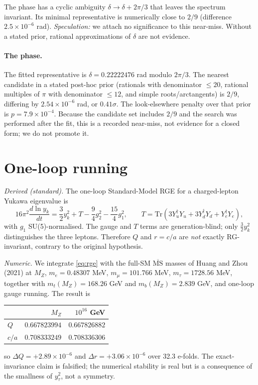 \documentclass[11pt]{article}
\begin{document}
The phase has a cyclic ambiguity $\delta\to\delta+2\pi/3$ that leaves the
spectrum invariant. Its minimal representative is numerically close to $2/9$
(difference $2.5\times10^{-6}$ rad). \emph{Speculation:} we attach no
significance to this near-miss. Without a stated prior, rational
approximations of $\delta$ are not evidence.

\paragraph{The phase.} The fitted representative is
$\delta=0.22222476$ rad modulo $2\pi/3$. The nearest candidate in a stated
post-hoc prior (rationals with denominator $\le20$, rational multiples of
$\pi$ with denominator $\le12$, and simple roots/arctangents) is $2/9$,
differing by $2.54\times10^{-6}$ rad, or $0.41\sigma$. The look-elsewhere
penalty over that prior is $p=7.9\times10^{-4}$. Because the candidate set
includes $2/9$ and the search was performed after the fit, this is a recorded
near-miss, not evidence for a closed form; we do not promote it.

\section{One-loop running}
\label{sec:rg}

\emph{Derived (standard).} The one-loop Standard-Model RGE for a charged-lepton
Yukawa eigenvalue is
\begin{equation}
16\pi^2\frac{d\ln y_k}{dt}
=\frac32 y_k^2+T-\frac94 g_2^2-\frac{15}{4}g_1^2,
\qquad
T=\mathrm{Tr}\!\left(3Y_u^\dagger Y_u+3Y_d^\dagger Y_d+Y_e^\dagger Y_e\right),
\label{eq:rge}
\end{equation}
with $g_1$ SU(5)-normalised. The gauge and $T$ terms are generation-blind; only
$\frac32y_k^2$ distinguishes the three leptons. Therefore $Q$ and $r=c/a$ are
\emph{not} exactly RG-invariant, contrary to the original hypothesis.

\emph{Numeric.} We integrate \eqref{eq:rge} with the full-SM
$\overline{\mathrm{MS}}$ masses of Huang and Zhou (2021) at $M_Z$,
$m_e=0.48307$ MeV, $m_\mu=101.766$ MeV, $m_\tau=1728.56$ MeV, together with
$m_t(M_Z)=168.26$ GeV and $m_b(M_Z)=2.839$ GeV, and one-loop gauge running.
The result is
\begin{center}
\begin{tabular}{lrr}
\toprule
 & $M_Z$ & $10^{16}$ GeV\\
\midrule
$Q$ & $0.667823994$ & $0.667826882$\\
$c/a$ & $0.708333249$ & $0.708336306$\\
\bottomrule
\end{tabular}
\end{center}
so $\Delta Q=+2.89\times10^{-6}$ and $\Delta r=+3.06\times10^{-6}$ over 32.3
e-folds. The exact-invariance claim is falsified; the numerical stability is
real but is a consequence of the smallness of $y_\tau^2$, not a symmetry.
\end{document}

